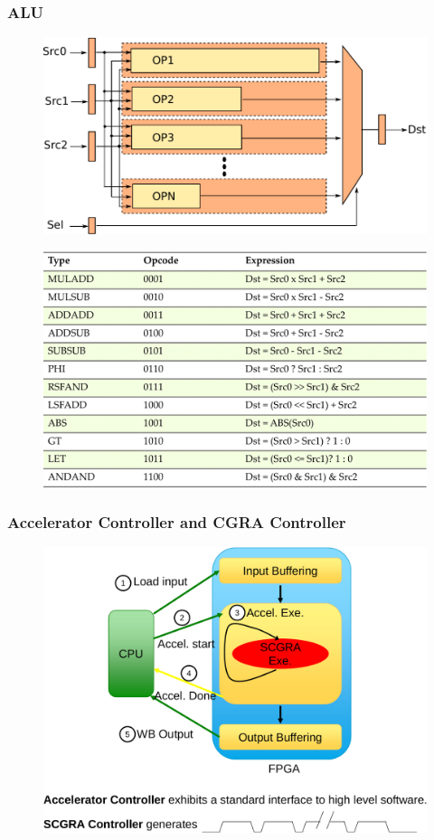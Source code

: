 \documentclass[accentcolor=tud1a,colorbacktitle,inverttitle,landscape,german,presentation,t]{tudbeamer}
\begin{document}
  \begin{frame}
  \frametitle{ALU}
  \vspace{-1em}
  \begin{figure}
    \includegraphics[width=.55\linewidth]{alu}
  \end{figure}
  \vspace{-0.5em}
  \begin{figure}
    \includegraphics[width=.55\linewidth]{op-table}
  \end{figure}
  \end{frame}

  \begin{frame}
  \frametitle{Accelerator Controller and CGRA Controller}
  \begin{figure}
    \includegraphics[width=.75\linewidth]{controller}
  \end{figure}
  \end{frame}
\end{document}
